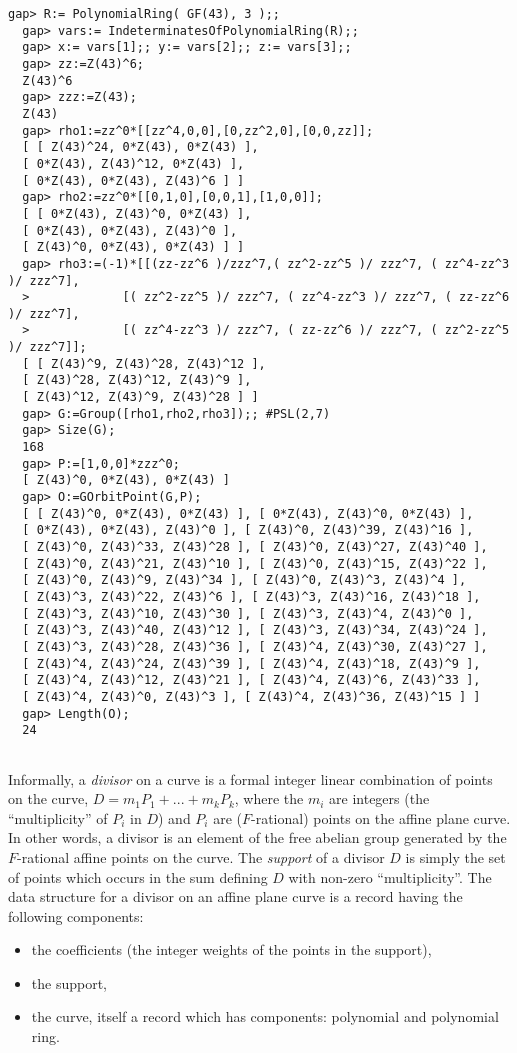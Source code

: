 \documentclass[a4paper,11pt]{report}
\begin{document}
{{ 
\begin{Verbatim}[fontsize=\small,frame=single,label=Example]
  gap> R:= PolynomialRing( GF(43), 3 );;
  gap> vars:= IndeterminatesOfPolynomialRing(R);;
  gap> x:= vars[1];; y:= vars[2];; z:= vars[3];;
  gap> zz:=Z(43)^6;
  Z(43)^6
  gap> zzz:=Z(43);
  Z(43)
  gap> rho1:=zz^0*[[zz^4,0,0],[0,zz^2,0],[0,0,zz]];
  [ [ Z(43)^24, 0*Z(43), 0*Z(43) ], 
  [ 0*Z(43), Z(43)^12, 0*Z(43) ], 
  [ 0*Z(43), 0*Z(43), Z(43)^6 ] ]
  gap> rho2:=zz^0*[[0,1,0],[0,0,1],[1,0,0]];
  [ [ 0*Z(43), Z(43)^0, 0*Z(43) ], 
  [ 0*Z(43), 0*Z(43), Z(43)^0 ], 
  [ Z(43)^0, 0*Z(43), 0*Z(43) ] ]
  gap> rho3:=(-1)*[[(zz-zz^6 )/zzz^7,( zz^2-zz^5 )/ zzz^7, ( zz^4-zz^3 )/ zzz^7],
  >             [( zz^2-zz^5 )/ zzz^7, ( zz^4-zz^3 )/ zzz^7, ( zz-zz^6 )/ zzz^7],
  >             [( zz^4-zz^3 )/ zzz^7, ( zz-zz^6 )/ zzz^7, ( zz^2-zz^5 )/ zzz^7]];
  [ [ Z(43)^9, Z(43)^28, Z(43)^12 ], 
  [ Z(43)^28, Z(43)^12, Z(43)^9 ], 
  [ Z(43)^12, Z(43)^9, Z(43)^28 ] ]
  gap> G:=Group([rho1,rho2,rho3]);; #PSL(2,7)
  gap> Size(G);
  168
  gap> P:=[1,0,0]*zzz^0;
  [ Z(43)^0, 0*Z(43), 0*Z(43) ]
  gap> O:=GOrbitPoint(G,P);
  [ [ Z(43)^0, 0*Z(43), 0*Z(43) ], [ 0*Z(43), Z(43)^0, 0*Z(43) ], 
  [ 0*Z(43), 0*Z(43), Z(43)^0 ], [ Z(43)^0, Z(43)^39, Z(43)^16 ], 
  [ Z(43)^0, Z(43)^33, Z(43)^28 ], [ Z(43)^0, Z(43)^27, Z(43)^40 ],
  [ Z(43)^0, Z(43)^21, Z(43)^10 ], [ Z(43)^0, Z(43)^15, Z(43)^22 ], 
  [ Z(43)^0, Z(43)^9, Z(43)^34 ], [ Z(43)^0, Z(43)^3, Z(43)^4 ], 
  [ Z(43)^3, Z(43)^22, Z(43)^6 ], [ Z(43)^3, Z(43)^16, Z(43)^18 ],
  [ Z(43)^3, Z(43)^10, Z(43)^30 ], [ Z(43)^3, Z(43)^4, Z(43)^0 ], 
  [ Z(43)^3, Z(43)^40, Z(43)^12 ], [ Z(43)^3, Z(43)^34, Z(43)^24 ], 
  [ Z(43)^3, Z(43)^28, Z(43)^36 ], [ Z(43)^4, Z(43)^30, Z(43)^27 ],
  [ Z(43)^4, Z(43)^24, Z(43)^39 ], [ Z(43)^4, Z(43)^18, Z(43)^9 ], 
  [ Z(43)^4, Z(43)^12, Z(43)^21 ], [ Z(43)^4, Z(43)^6, Z(43)^33 ], 
  [ Z(43)^4, Z(43)^0, Z(43)^3 ], [ Z(43)^4, Z(43)^36, Z(43)^15 ] ]
  gap> Length(O);
  24
  
\end{Verbatim}
 Informally, a \emph{divisor}  on a curve is a formal integer linear combination of points on the curve, $D=m_1P_1+...+m_kP_k$, where the $m_i$ are integers (the ``multiplicity'' of $P_i$ in $D$) and $P_i$ are ($F$-rational) points on the affine plane curve. In other words, a divisor is an
element of the free abelian group generated by the $F$-rational affine points on the curve. The \emph{support}  of a divisor $D$ is simply the set of points which occurs in the sum defining $D$ with non-zero ``multiplicity''. The data structure for a divisor on an affine
plane curve is a record having the following components: 
\begin{itemize}
\item  the coefficients (the integer weights of the points in the support), 
\item  the support, 
\item  the curve, itself a record which has components: polynomial and polynomial
ring. 
\end{itemize}
 

}}
\end{document}
